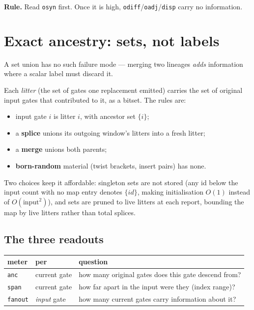 \documentclass[11pt]{article}
\begin{document}
\medskip
\noindent\textbf{Rule.} Read \texttt{osyn} first. Once it is high,
\texttt{odiff}/\texttt{oadj}/\texttt{disp} carry no information.

\section{Exact ancestry: sets, not labels}

A set union has no such failure mode --- merging two lineages \emph{adds}
information where a scalar label must discard it.

Each \emph{litter} (the set of gates one replacement emitted) carries the set of
original input gates that contributed to it, as a bitset. The rules are:

\begin{itemize}
\item input gate $i$ is litter $i$, with ancestor set $\{i\}$;
\item a \textbf{splice} unions its outgoing window's litters into a fresh litter;
\item a \textbf{merge} unions both parents;
\item \textbf{born-random} material (twist brackets, insert pairs) has none.
\end{itemize}

Two choices keep it affordable: singleton sets are not stored (any id below the
input count with no map entry denotes $\{id\}$, making initialisation $O(1)$
instead of $O(\text{input}^2)$), and sets are pruned to live litters at each
report, bounding the map by live litters rather than total splices.

\subsection{The three readouts}

\begin{center}
\begin{tabular}{llp{7.4cm}}
\toprule
meter & per & question \\
\midrule
\texttt{anc}    & current gate & how many original gates does this gate descend from? \\
\texttt{span}   & current gate & how far apart in the input were they (index range)? \\
\texttt{fanout} & \emph{input} gate & how many current gates carry information about it? \\
\bottomrule
\end{tabular}
\end{center}
\end{document}

